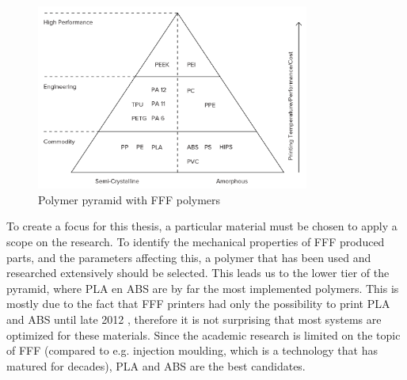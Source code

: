 \begin{figure}[htb]
    \centering
    \includegraphics[width=0.8\textwidth]{chapter_2/figures/Pyramidpolymer.png}
    \caption{Polymer pyramid with FFF polymers \cite{3DHubsIntroductionPrinting}}
    \label{fig:pyramidpolymer}
\end{figure}

To create a focus for this thesis, a particular material must be chosen to apply a scope on the research. To identify the mechanical properties of FFF produced parts, and the parameters affecting this, a polymer that has been used and researched extensively should be selected. This leads us to the lower tier of the pyramid, where PLA en ABS are by far the most implemented polymers. This is mostly due to the fact that FFF printers had only the possibility to print PLA and ABS until late 2012 \cite{WohlersAssociates2017WohlersIndustry}, therefore it is not surprising that most systems are optimized for these materials. Since the academic research is limited on the topic of FFF (compared to e.g. injection moulding, which is a technology that has matured for decades), PLA and ABS are the best candidates.

